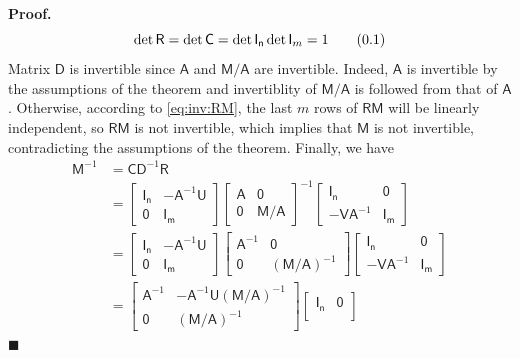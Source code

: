 \documentclass[10pt]{article}
\theoremstyle{definition}
\theoremstyle{definition}
\theoremstyle{remark}
\newenvironment{prf}{\noindent\textbf{Proof.}}{\hfill$\blacksquare$}
\newcommand\eqnum{\addtocounter{equation}{1}\tag{\arabic{section}.\arabic{equation}}}
\begin{document}
\begin{prf}
\begin{equation}
\det\mathsf{R} = \det\mathsf{C} = \det\mathsf{I_n}\det\mathsf{I}_m = 1
\eqnum
\label{eq:det:RC}
\end{equation}
Matrix $\mathsf{D}$ is invertible since $\mathsf{A}$ and $\mathsf{M}/\mathsf{A}$ are invertible. Indeed, $\mathsf{A}$ is invertible by the assumptions of the theorem and invertiblity of $\mathsf{M}/\mathsf{A}$ is followed from that of $\mathsf{A}$. Otherwise, according to \cref{eq:inv:RM}, the last $m$ rows of $\mathsf{R}\mathsf{M}$ will be linearly independent, so $\mathsf{R}\mathsf{M}$ is not invertible, which implies that $\mathsf{M}$ is not invertible, contradicting the assumptions of the theorem. Finally, we have
\begin{align*}
\mathsf{M}^{-1} &= \mathsf{C}\mathsf{D}^{-1}\mathsf{R} \\
&= 
\begin{bmatrix}
\mathsf{I_n} & -\mathsf{A}^{-1}\mathsf{U} \\
\mathsf{0} & \mathsf{I_m}
\end{bmatrix}
\begin{bmatrix}
\mathsf{A} & \mathsf{0} \\
\mathsf{0} & \mathsf{M}/\mathsf{A}
\end{bmatrix}^{-1}
\begin{bmatrix}
\mathsf{I_n} & \mathsf{0} \\
-\mathsf{V}\mathsf{A}^{-1} & \mathsf{I_m}
\end{bmatrix} \\ &=
\begin{bmatrix}
\mathsf{I_n} & -\mathsf{A}^{-1}\mathsf{U} \\
\mathsf{0} & \mathsf{I_m}
\end{bmatrix}
\begin{bmatrix}
\mathsf{A}^{-1} & \mathsf{0} \\
\mathsf{0} & (\mathsf{M}/\mathsf{A})^{-1}
\end{bmatrix}
\begin{bmatrix}
\mathsf{I_n} & \mathsf{0} \\
-\mathsf{V}\mathsf{A}^{-1} & \mathsf{I_m}
\end{bmatrix} \\ &=
\begin{bmatrix}
\mathsf{A}^{-1} & -\mathsf{A}^{-1}\mathsf{U}(\mathsf{M}/\mathsf{A})^{-1} \\
\mathsf{0} & (\mathsf{M}/\mathsf{A})^{-1}
\end{bmatrix}
\begin{bmatrix}
\mathsf{I_n} & \mathsf{0} \\

\end{bmatrix}
\end{align*}
\end{prf}
\end{document}
